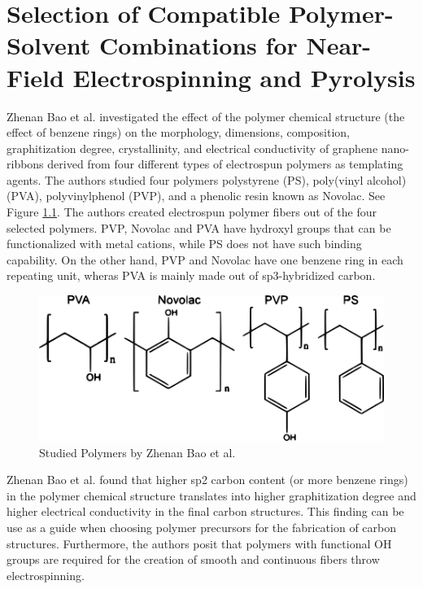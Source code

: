 
\chapter{Selection of Compatible Polymer-Solvent Combinations for Near-Field Electrospinning and Pyrolysis} %

\label{Chapter:3}


Zhenan Bao et al. \cite{Liu2015a} investigated the effect of the polymer chemical structure (the effect of benzene rings) on the morphology, dimensions, composition, graphitization degree, crystallinity, and electrical conductivity of graphene nano-ribbons derived from four different types of electrospun polymers as templating agents. The authors studied four polymers polystyrene (PS), poly(vinyl alcohol) (PVA), polyvinylphenol (PVP), and a phenolic resin known as Novolac. See Figure \ref{fig:zhenanBaoPolymers}. The authors created  electrospun polymer fibers out of the four selected polymers. PVP, Novolac and PVA have hydroxyl groups that can be functionalized with metal cations, while PS does not have such binding capability. On the other hand, PVP and Novolac have one benzene ring in each repeating unit, wheras PVA is mainly made out of sp3-hybridized carbon.

\begin{figure}[!th]
\centering
\includegraphics[scale=0.35]{./Figures/zhenanBaoPolymers.png}
\decoRule
\caption[Studied Polymers by Zhenan Bao et al. \cite{Liu2015a}]{Studied Polymers by Zhenan Bao et al. \cite{Liu2015a}}
\label{fig:zhenanBaoPolymers}
\end{figure}

Zhenan Bao et al. \cite{Liu2015a} found that higher sp2 carbon content (or more benzene rings) in the polymer chemical structure translates into higher graphitization degree and higher electrical conductivity in the final carbon structures. This finding can be use as a guide when choosing polymer precursors for the fabrication of carbon structures. Furthermore, the authors posit that polymers with functional OH groups are required for the creation of smooth and continuous fibers throw electrospinning. \cite{Liu2015a}

